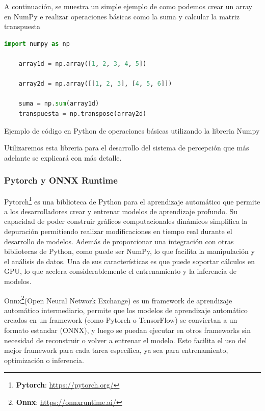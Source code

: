 A continuación, se muestra un simple ejemplo de como podemos crear un array en NumPy e realizar operaciones básicas como la suma y calcular la matriz transpuesta

\begin{code}[h]
  \begin{lstlisting}[language=Python]
    import numpy as np

    array1d = np.array([1, 2, 3, 4, 5])

    array2d = np.array([[1, 2, 3], [4, 5, 6]])

    suma = np.sum(array1d)  
    transpuesta = np.transpose(array2d)  
  \end{lstlisting}
  \caption[Ejemplo de código en Python de operaciones básicas utilizando la libreria Numpy]{Ejemplo de código en Python de operaciones básicas utilizando la libreria Numpy}
  \label{cod:Numpy}
  \end{code}  

Utilizaremos esta libreria para el desarrollo del sistema de percepción que más adelante se explicará con más detalle. 

\subsubsection{Pytorch y ONNX Runtime}
\label{sec:pytorchandonnx}
Pytorch\footnote{\textbf{Pytorch}: \url{https://pytorch.org/}} es una biblioteca de Python para el aprendizaje automático que permite a 
los desarrolladores crear y entrenar modelos de aprendizaje profundo.  Su capacidad de poder construir gráficos computacionales dinámicos 
simplifica la depuración permitiendo realizar modificaciones en tiempo real durante el desarrollo de modelos.
Además de proporcionar una integración con otras bibliotecas de Python, como puede ser NumPy, lo que facilita la manipulación y el análisis de datos.
Una de sus características es que puede soportar cálculos en GPU, lo que acelera considerablemente el entrenamiento y la inferencia de modelos. \newline

Onnx\footnote{\textbf{Onnx}: \url{https://onnxruntime.ai/}}(Open Neural Network Exchange) es un framework de aprendizaje automático intermediario, 
permite que los modelos de aprendizaje automático creados en un framework (como Pytorch o TensorFlow) se conviertan a un formato estandar (ONNX), 
y luego se puedan ejecutar en otros frameworks sin necesidad de reconstruir o volver a entrenar el modelo. 
Esto facilita el uso del mejor framework para cada tarea específica, ya sea para entrenamiento, optimización o inferencia. \newline

